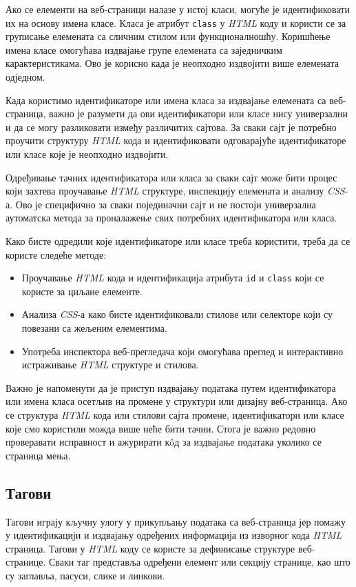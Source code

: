 \documentclass[12pt,oneside]{memoir}
\begin{document}
Ако се елементи на веб-страници налазе у истој класи, могуће је идентификовати их на основу имена класе. Класа је атрибут \texttt{class} у \textit{HTML} коду и користи се за груписање елемената са сличним стилом или функционалношћу. Коришћење имена класе омогућава издвајање групе елемената са заједничким карактеристикама. Ово је корисно када је неопходно издвојити више елемената одједном.

Када користимо идентификаторе или имена класа за издвајање елемената са веб-страница, важно је разумети да ови идентификатори или класе нису универзални и да се могу разликовати између различитих сајтова. За сваки сајт је потребно проучити структуру \textit{HTML} кода и идентификовати одговарајуће идентификаторе или класе које је неопходно издвојити.

Одређивање тачних идентификатора или класа за сваки сајт може бити процес који захтева проучавање \textit{HTML} структуре, инспекцију елемената и анализу \textit{CSS}-а. Ово је специфично за сваки појединачни сајт и не постоји универзална аутоматска метода за проналажење свих потребних идентификатора или класа.

Како бисте одредили које идентификаторе или класе треба користити, треба да се користе следеће методе:
\begin{itemize}
\item Проучавање \textit{HTML} кода и идентификација атрибута \texttt{id} и \texttt{class}  који се користе за циљане елементе.
\item Анализа \textit{CSS}-а како бисте идентификовали стилове или селекторе који су повезани са жељеним елементима.
\item Употреба инспектора веб-прегледача који омогућава преглед и интерактивно истраживање \textit{HTML} структуре и стилова.
\end{itemize}

Важно је напоменути да је приступ издвајању података путем идентификатора или имена класа осетљив на промене у структури или дизајну веб-страница. Ако се структура \textit{HTML} кода или стилови сајта промене, идентификатори или класе које смо користили можда више неће бити тачни. Стога је важно редовно проверавати исправност и ажурирати кôд за издвајање података уколико се страница мења.

\subsection{Тагови}
Тагови играју кључну улогу у прикупљању података са веб-страница јер помажу у идентификацији и издвајању одређених информација из изворног кода \textit{HTML} страница. Тагови у \textit{HTML} коду се користе за дефинисање структуре веб-странице. Сваки таг представља одређени елемент или секцију странице, као што су заглавља, пасуси, слике и линкови.
\end{document}
